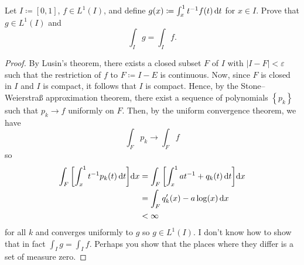 \begin{problem}
Let $I\coloneqq[0,1]$, $f\in L^1(I)$, and define $g(x)\coloneqq\int_x^1
t^{-1}f(t)\mathop{}\!\mathrm{d} t$ for $x\in I$. Prove that $g\in L^1(I)$ and
\[
\int_I g=\int_I f.
\]
\end{problem}
\begin{proof}
By Lusin's theorem, there exists a closed subset $F$ of $I$ with $|I\minus
F|<\varepsilon$ such that the restriction of $f$ to $F\coloneqq I\minus E$
is continuous. Now, since $F$ is closed in $I$ and $I$ is compact, it
follows that $I$ is compact. Hence, by the Stone--Weierstraß approximation
theorem, there exist a sequence of polynomials $\left\{ p_k \right\}$ such
that $p_k\to f$ uniformly on $F$. Then, by the uniform convergence theorem,
we have
\begin{equation}
  \label{eq:uniform-convergence-2-4}
\int_F p_k\longrightarrow \int_F f
\end{equation}
so
\begin{equation}
  \label{eq:uniform-convergence-2-2-4}
\begin{aligned}
\int_F\left[\int_x^1t^{-1}p_k(t)\mathop{}\!\mathrm{d} t\right]\!\mathop{}\!\mathrm{d} x
&=\int_F\left[\int_x^1 at^{-1}+q_k(t)\mathop{}\!\mathrm{d} t\right]\!\mathop{}\!\mathrm{d} x\\
&=\int_F q_k'(x)-a\log(x)\mathop{}\!\mathrm{d} x\\
&<\infty
\end{aligned}
\end{equation}
for all $k$ and converges uniformly to $g$ so $g\in L^1(I)$. I don't know
how to show that in fact $\int_I g=\int_I f$. Perhaps you show that the
places where they differ is a set of measure zero.
\end{proof}

